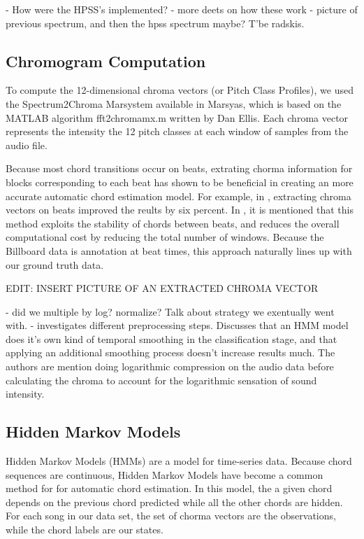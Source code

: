 \documentclass{article}
\begin{document}
- How were the HPSS's implemented?
- more deets on how these work
- picture of previous spectrum, and then the hpss spectrum maybe? T'be radskis.

\subsection{Chromogram Computation}

To compute the 12-dimensional chroma vectors (or Pitch Class Profiles), we used the 
Spectrum2Chroma Marsystem available in Marsyas, which is based on the MATLAB algorithm 
fft2chromamx.m written by Dan Ellis.
Each chroma vector represents the intensity the 12 pitch classes at each window of 
samples from the audio file. 

Because most chord transitions occur on beats, extrating chorma information for blocks corresponding
to each beat has shown to be beneficial in creating an more accurate automatic chord
estimation model. For example, in \cite{Zenz:20}, extracting chroma vectors on beats improved
the reults by six percent. In \cite{McVicor:00}, it is mentioned that this method exploits the stability
of chords between beats, and reduces the overall computational cost by reducing the total
number of windows. Because the Billboard data is annotation at beat times, this approach naturally
lines up with our ground truth data.

EDIT: INSERT PICTURE OF AN EXTRACTED CHROMA VECTOR

- did we multiple by log? normalize? Talk about strategy we exentually went with.
- \cite{Jiang:22} investigates different preprocessing steps. Discusses that
an HMM model does it's own kind of temporal smoothing in the classification
stage, and that applying an additional smoothing process doesn't increase results much.
The authors are mention doing logarithmic compression on the audio data before
calculating the chroma to account for the logarithmic sensation of sound intensity.

\subsection{Hidden Markov Models}

Hidden Markov Models (HMMs) are a model for time-series data. Because chord sequences are continuous,  Hidden Markov Models have become a common method for for automatic chord estimation. In this model, the a given chord depends on the previous chord predicted while all the other chords are hidden. For each song in our data set, the set of chorma vectors are the observations, while the chord labels are our states. 
\end{document}
